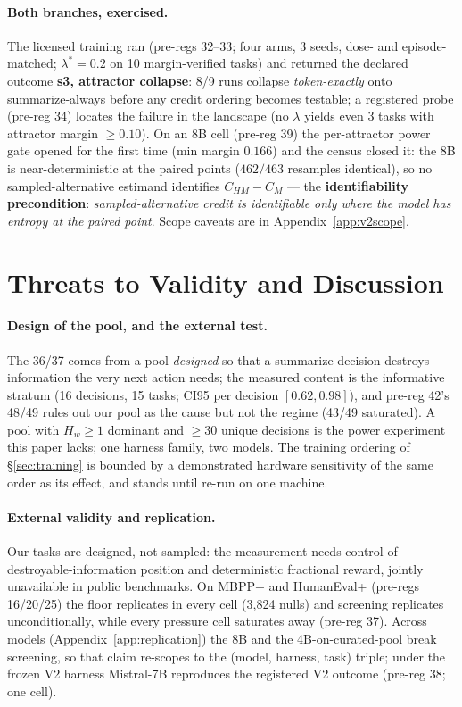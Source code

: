 \documentclass{article}
\theoremstyle{remark}
\begin{document}
\paragraph{Both branches, exercised.} The licensed training ran
(pre-regs 32--33; four arms, 3 seeds, dose- and episode-matched;
$\lambda^{*}=0.2$ on 10 margin-verified tasks) and returned the declared
outcome \textbf{s3, attractor collapse}: 8/9 runs collapse
\emph{token-exactly} onto summarize-always before any credit ordering
becomes testable; a registered probe (pre-reg 34) locates the failure in
the landscape (no $\lambda$ yields even 3 tasks with attractor margin
$\geq 0.10$). On an 8B cell (pre-reg 39) the per-attractor power gate
opened for the first time (min margin $0.166$) and the census closed it:
the 8B is near-deterministic at the paired points ($462/463$ resamples
identical), so no sampled-alternative estimand identifies $C_{HM}-C_M$
--- the \textbf{identifiability precondition}: \emph{sampled-alternative
credit is identifiable only where the model has entropy at the paired
point}. Scope caveats are in Appendix~\ref{app:v2scope}.

\section{Threats to Validity and Discussion}
\label{sec:threats}
\paragraph{Design of the pool, and the external test.} The 36/37 comes
from a pool \emph{designed} so that a summarize decision destroys
information the very next action needs; the measured content is the
informative stratum (16 decisions, 15 tasks; CI95 per decision $[0.62,
0.98]$), and pre-reg 42's 48/49 rules out our pool as the cause but not
the regime (43/49 saturated). A pool with $H_w \geq 1$ dominant and
$\geq 30$ unique decisions is the power experiment this paper lacks;
one harness family, two models. The training ordering of
\S\ref{sec:training} is bounded by a demonstrated hardware sensitivity
of the same order as its effect, and stands until re-run on one machine.

\paragraph{External validity and replication.} Our tasks are designed,
not sampled: the measurement needs control of destroyable-information
position and deterministic fractional reward, jointly unavailable in
public benchmarks. On MBPP+ and HumanEval+ (pre-regs 16/20/25) the floor
replicates in every cell (3{,}824 nulls) and screening replicates
unconditionally, while every pressure cell saturates away (pre-reg 37).
Across models (Appendix~\ref{app:replication}) the 8B and the
4B-on-curated-pool break screening, so that claim re-scopes to the
(model, harness, task) triple; under the frozen V2 harness Mistral-7B
reproduces the registered V2 outcome (pre-reg 38; one cell).
\end{document}
